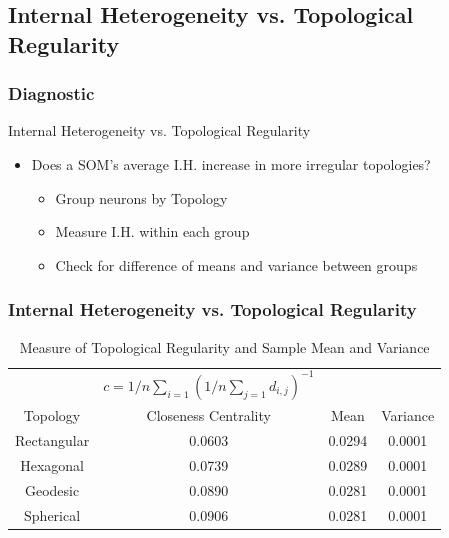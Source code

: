 \documentclass[nototal,handout]{beamer}
\begin{document}
\subsection{Internal Heterogeneity vs. Topological Regularity} 

\begin{frame}
	\frametitle{Diagnostic}
 
\begin{block}{Internal Heterogeneity vs. Topological Regularity}
 \begin{itemize}
 \item  Does a SOM's average I.H. increase in more irregular topologies?
 \begin{itemize}
 \item  Group neurons by Topology
 \item  Measure I.H. within each group
 \item  Check for difference of means and variance between groups
 \end{itemize}
 \end{itemize}
 \end{block} \end{frame} 

\begin{frame}
	\frametitle{Internal Heterogeneity vs. Topological Regularity}
  \begin{table}
  \centering
  \begin{minipage}{\textwidth}
  \caption{Measure of Topological Regularity and Sample Mean and Variance}
  \label{vardeg}
  \begin{tabular}{|c||c|c|c|}
  \hline
  &$c=1/n \sum_{i=1} (1/n \sum_{j=1} d_{i,j})^{-1}$&&\\
  Topology & Closeness Centrality & Mean & Variance\\
  \hline
  Rectangular & 0.0603 & 0.0294 &0.0001\\
  Hexagonal & 0.0739 & 0.0289 &0.0001\\
  Geodesic & 0.0890 & 0.0281 &0.0001\\
  Spherical & 0.0906 & 0.0281 &0.0001\\
  \hline
  \end{tabular}
  \end{minipage}
  \end{table}
 \end{frame} 
\end{document}
